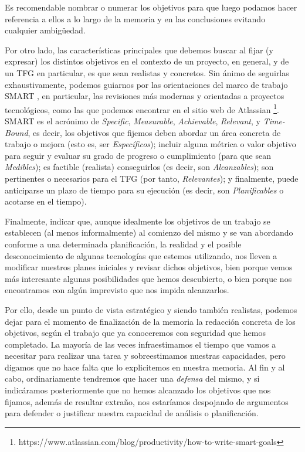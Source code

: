 Es recomendable nombrar o numerar los objetivos para que luego podamos hacer referencia a ellos a lo largo de la memoria y en las conclusiones evitando cualquier ambigüedad.


Por otro lado, las características principales que debemos buscar al fijar (y expresar) los distintos objetivos en el contexto de un proyecto, en general, y de un TFG en particular, es que sean realistas y concretos. Sin ánimo de seguirlas exhaustivamente, podemos guiarnos por las orientaciones del marco de trabajo SMART \cite{doran1981there}, en particular, las revisiones más modernas y orientadas a proyectos tecnológicos, como las que podemos encontrar en el sitio web de Atlassian \footnote{https://www.atlassian.com/blog/productivity/how-to-write-smart-goals}. SMART es el acrónimo de \textit{Specific}, \textit{Measurable}, \textit{Achievable}, \textit{Relevant}, y \textit{Time-Bound}, es decir, los objetivos que fijemos deben abordar un área concreta de trabajo o mejora (esto es, ser \textit{Específicos}); incluir alguna métrica o valor objetivo para seguir y evaluar su grado de progreso o cumplimiento (para que sean \textit{Medibles}); es factible (realista) conseguirlos (es decir, son \textit{Alcanzables}); son pertinentes o necesarios para el TFG (por tanto, \textit{Relevantes}); y finalmente, puede anticiparse un plazo de tiempo para su ejecución (es decir, son \textit{Planificables} o acotarse en el tiempo).

Finalmente, indicar que, aunque idealmente los objetivos de un trabajo se establecen (al menos informalmente) al comienzo del mismo y se van abordando conforme a una determinada planificación, la realidad y el posible desconocimiento de algunas tecnologías que estemos utilizando, nos lleven a modificar nuestros planes iniciales y revisar dichos objetivos, bien porque vemos más interesante algunas posibilidades que hemos descubierto, o bien porque nos encontramos con algún imprevisto que nos impida alcanzarlos.

Por ello, desde un punto de vista estratégico y siendo también realistas, podemos dejar para el momento de finalización de la memoria la redacción concreta de los objetivos, según el trabajo que ya conoceremos con seguridad que hemos completado. La mayoría de las veces infraestimamos el tiempo que vamos a necesitar para realizar una tarea y sobreestimamos nuestras capacidades, pero digamos que no hace falta que lo explicitemos en nuestra memoria. Al fin y al cabo, ordinariamente tendremos que hacer una \textit{defensa} del mismo, y si indicáramos posteriormente que no hemos alcanzado los objetivos que nos fijamos, además de resultar extraño, nos estaríamos despojando de argumentos para defender o justificar nuestra capacidad de análisis o planificación.  

